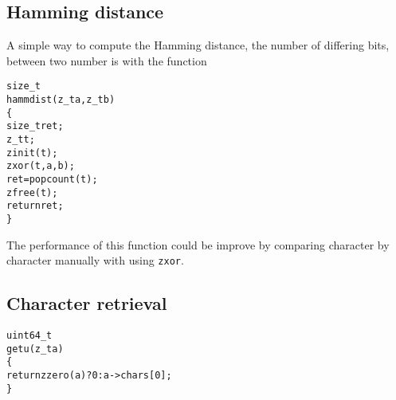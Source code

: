 \subsection{Hamming distance}
\label{sec:Hamming distance}

A simple way to compute the Hamming distance,
the number of differing bits, between two number
is with the function

\begin{alltt}
   size_t
   hammdist(z_t a, z_t b)
   \{
       size_t ret;
       z_t t;
       zinit(t);
       zxor(t, a, b);
       ret = popcount(t);
       zfree(t);
       return ret;
   \}
\end{alltt}

\noindent
The performance of this function could
be improve by comparing character by
character manually with using {\tt zxor}.


\subsection{Character retrieval}
\label{sec:Character retrieval}

\begin{alltt}
   uint64_t
   getu(z_t a)
   \{
       return zzero(a) ? 0 : a->chars[0];
   \}
\end{alltt}
